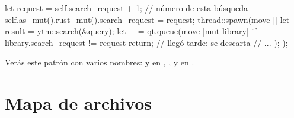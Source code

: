 \begin{rust}
let request = self.search_request + 1;     // número de esta búsqueda
self.as_mut().rust_mut().search_request = request;
thread::spawn(move || {
    let result = ytm::search(&query);
    let _ = qt.queue(move |mut library| {
        if library.search_request != request { return; }   // llegó tarde: se descarta
        // ...
    });
});
\end{rust}

Verás este patrón con varios nombres:  y  en ,
,  y  en .

\section{Mapa de archivos}

